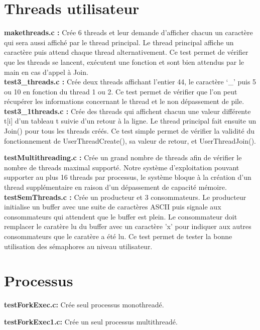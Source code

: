 \documentclass[12pt]{report}
\begin{document}
\section{Threads utilisateur}

\textbf{makethreads.c :}
Crée 6 threads et leur demande d’afficher chacun un caractère qui sera aussi affiché par le thread principal. Le thread principal
affiche un caractère puis attend chaque thread alternativement. Ce test permet de vérifier que les
threads se lancent, exécutent une fonction et sont bien attendus par le main en cas d'appel à Join.\\

\textbf{test3\_threads.c :} Crée deux threads affichant l’entier 44, le caractère ‘\_’ puis 5 ou 10 en
fonction du thread 1 ou 2. Ce test permet de vérifier que l’on peut récupérer les informations
concernant le thread et le non dépassement de pile.\\

\textbf{test3\_1threads.c :} Crée des threads qui affichent chacun une valeur différente t[i] d’un
tableau t suivie d’un retour à la ligne. Le thread principal fait ensuite un Join() pour tous les threads
créés. Ce test simple permet de vérifier la validité du fonctionnement de UserThreadCreate(), sa
valeur de retour, et UserThreadJoin().
\newpage

\textbf{testMultithreading.c :} Crée un grand nombre de threads afin de vérifier le nombre de threads maximal supporté. Notre système d'exploitation pouvant supporter au plus 16 threads par processus, le système bloque à la création d'un thread supplémentaire en raison d'un dépassement de capacité mémoire.\\

\textbf{testSemThreads.c :} Crée un producteur et 3 consommateurs. Le producteur initialise un buffer avec une suite de caractères ASCII puis signale aux consommateurs qui attendent que le buffer est plein. Le consommateur doit remplacer le caratère lu du buffer avec un caractère 'x' pour indiquer aux autres consommateurs que le caratère a été lu. Ce test permet de tester la bonne utilisation des sémaphores au niveau utilisateur.
\bigskip

\section{Processus}

\textbf{testForkExec.c:} Crée seul processus monothreadé.
\bigskip

\textbf{testForkExec1.c:} Crée un seul processus multithreadé.
\bigskip
\end{document}
